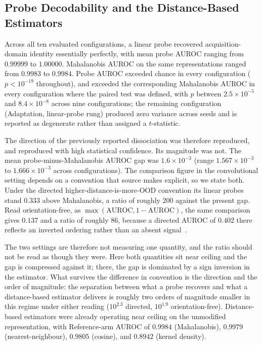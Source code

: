 \subsection{Probe Decodability and the Distance-Based Estimators}

Across all ten evaluated configurations, a linear probe recovered
acquisition-domain identity essentially perfectly, with mean probe AUROC
ranging from $0.99999$ to $1.00000$. Mahalanobis AUROC on the same
representations ranged from $0.9983$ to $0.9984$. Probe AUROC exceeded chance
in every configuration ($p < 10^{-19}$ throughout), and exceeded the
corresponding Mahalanobis AUROC in every configuration where the paired test
was defined, with $p$ between $2.5\times10^{-5}$ and $8.4\times10^{-8}$ across
nine configurations; the remaining configuration (Adaptation, linear-probe
rung) produced zero variance across seeds and is reported as degenerate
rather than assigned a $t$-statistic.

The direction of the previously reported dissociation was therefore
reproduced, and reproduced with high statistical confidence. Its magnitude
was not. The mean probe-minus-Mahalanobis AUROC gap was
$1.6\times10^{-3}$ (range $1.567\times10^{-3}$ to $1.666\times10^{-3}$ across
configurations). The comparison figure in the convolutional setting depends on
a convention that source makes explicit, so we state both. Under the directed
higher-distance-is-more-OOD convention its linear probes stand $0.333$ above
Mahalanobis, a ratio of roughly $200$ against the present gap. Read
orientation-free, as $\max(\mathrm{AUROC}, 1-\mathrm{AUROC})$, the same
comparison gives $0.137$ and a ratio of roughly $86$, because a directed AUROC
of $0.402$ there reflects an inverted ordering rather than an absent
signal~\cite{tran2026decodable}.

The two settings are therefore not measuring one quantity, and the ratio should
not be read as though they were. Here both quantities sit near ceiling and the
gap is compressed against it; there, the gap is dominated by a sign inversion
in the estimator. What survives the difference in convention is the direction
and the order of magnitude: the separation between what a probe recovers and
what a distance-based estimator delivers is roughly two orders of magnitude
smaller in this regime under either reading ($10^{2.3}$ directed,
$10^{1.9}$ orientation-free). Distance-based estimators were already operating near
ceiling on the unmodified representation, with Reference-arm AUROC of
$0.9984$ (Mahalanobis), $0.9979$ (nearest-neighbour), $0.9805$ (cosine), and
$0.8942$ (kernel density).


